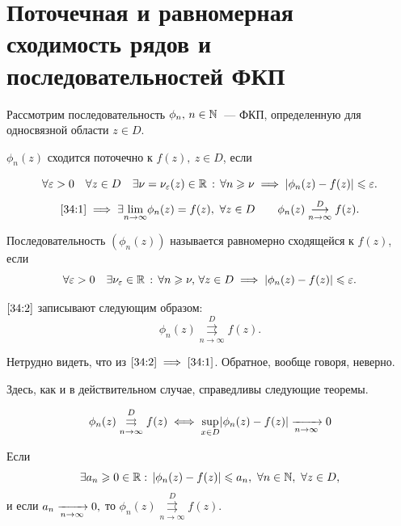 \documentclass[../../main.tex]{subfiles}
\begin{document}
\section{Поточечная и равномерная сходимость рядов и последовательностей ФКП}

Рассмотрим последовательность $ \phi_n,\, n \in \mathbb{N} $~--- ФКП, определенную для односвязной области $ z \in D $.

$ \phi_n(z) $ сходится поточечно к $ f(z),\ z \in D $, если

\begin{equation}\label{34:1}
	\forall \varepsilon > 0 \quad \forall z \in D \quad \exists\nu = \nu_\varepsilon (z) 
	\in \mathbb{R}\, :\,
	\forall n \geqslant \nu \implies |\phi_n(z) - f(z)| \leqslant \varepsilon.
\end{equation}
\[ \eqref{34:1} \implies \exists \underset{n \to \infty}{\lim} \phi_n (z) 
= f(z),\ 
\forall z \in D \qquad \phi_n(z) \overset{D}{\underset{n \to 
\infty}\longrightarrow} f(z). \]

Последовательность $ (\phi_n(z)) $ называется равномерно сходящейся к $ f(z) 
$, если
\begin{equation}\label{34:2}
	\forall \varepsilon > 0 \quad \exists\nu_\varepsilon \in \mathbb{R}\, :\,
	\forall n \geqslant \nu,\, \forall z \in D \implies |\phi_n(z) - f(z)| \leqslant \varepsilon.
\end{equation}

$ \eqref{34:2} $ записывают следующим образом:
\[ \phi_n(z) \overset{D}{\underset{n \to \infty}\rightrightarrows} f(z). \]

Нетрудно видеть, что из $ \eqref{34:2} \implies \eqref{34:1} $. Обратное, 
вообще говоря, неверно.

Здесь, как и в действительном случае, справедливы следующие теоремы.

\begin{thm}
	\[ \phi_n(z) \overset{D}{\underset{n \to \infty}\rightrightarrows} f(z) \iff 
	\underset{x \in D}{\sup}|\phi_n(z) - f(z)| \xrightarrow[n \rightarrow \infty]{} 0 \]
\end{thm}

\begin{thm}
	Если 
	\[ \exists a_n \geqslant 0 \in \mathbb{R} :\, |\phi_n(z) - f(z)| \leqslant a_n,\ \forall n 
	\in \mathbb{N},\ \forall z \in D, \]
	и если $ a_n \xrightarrow[n \rightarrow \infty]{} 0, $
	то $ \phi_n(z) \overset{D}{\underset{n \to \infty}\rightrightarrows} f(z) $.
\end{thm}
\end{document}
